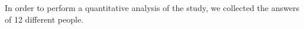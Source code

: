 In order to perform a quantitative analysis of the study, we collected the answers of 12 different people.
